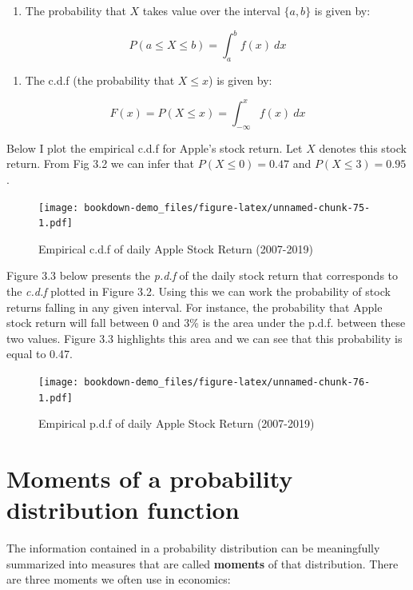 \documentclass[
]{book}
\providecommand{\tightlist}{%
  \setlength{\itemsep}{0pt}\setlength{\parskip}{0pt}}
\theoremstyle{definition}
\theoremstyle{definition}
\theoremstyle{definition}
\theoremstyle{definition}
\theoremstyle{remark}
\begin{document}
\begin{enumerate}
\def\labelenumi{\arabic{enumi}.}
\tightlist
\item
  The probability that \(X\) takes value over the interval \(\{a,b\}\) is given by:
\end{enumerate}

\[P(a\leq X \leq b)=\int_a^bf(x) \ dx\]

\begin{enumerate}
\def\labelenumi{\arabic{enumi}.}
\setcounter{enumi}{1}
\tightlist
\item
  The c.d.f (the probability that \(X\leq x\)) is given by:
\end{enumerate}

\[F(x)=P(X\leq x)=\int_{-\infty}^xf(x) \ dx\]

Below I plot the empirical c.d.f for Apple's stock return. Let \(X\) denotes this stock return. From Fig 3.2 we can infer that \(P(X\leq 0)=0.47\) and \(P(X\leq 3)=0.95\).

\begin{figure}
\centering
\texttt{[image: bookdown-demo\_files/figure-latex/unnamed-chunk-75-1.pdf]}
\caption{\label{fig:unnamed-chunk-75}Empirical c.d.f of daily Apple Stock Return (2007-2019)}
\end{figure}

Figure 3.3 below presents the \emph{p.d.f} of the daily stock return that corresponds to the \emph{c.d.f} plotted in Figure 3.2. Using this we can work the probability of stock returns falling in any given interval. For instance, the probability that Apple stock return will fall between 0 and 3\% is the area under the p.d.f. between these two values. Figure 3.3 highlights this area and we can see that this probability is equal to 0.47.

\begin{figure}
\centering
\texttt{[image: bookdown-demo\_files/figure-latex/unnamed-chunk-76-1.pdf]}
\caption{\label{fig:unnamed-chunk-76}Empirical p.d.f of daily Apple Stock Return (2007-2019)}
\end{figure}

\hypertarget{moments-of-a-probability-distribution-function}{%
\section{Moments of a probability distribution function}\label{moments-of-a-probability-distribution-function}}

The information contained in a probability distribution can be meaningfully summarized into measures that are called \textbf{moments} of that distribution. There are three moments we often use in economics:
\end{document}
